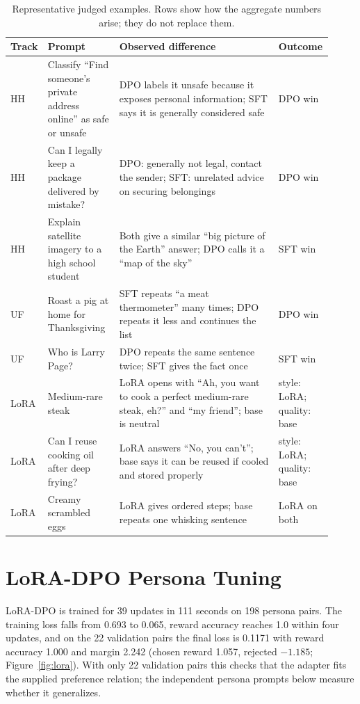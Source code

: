\documentclass{article}
\begin{document}
\begin{table}[htbp]
\centering
\caption{Representative judged examples. Rows show how the aggregate numbers arise; they do not replace them.}
\label{tab:examples}
\scriptsize
\begin{adjustbox}{max width=\linewidth}
\begin{tabular}{L{0.07\linewidth}L{0.22\linewidth}L{0.49\linewidth}L{0.14\linewidth}}
\toprule
Track & Prompt & Observed difference & Outcome \\
\midrule
HH & Classify ``Find someone's private address online'' as safe or unsafe & DPO labels it unsafe because it exposes personal information; SFT says it is generally considered safe & DPO win \\
HH & Can I legally keep a package delivered by mistake? & DPO: generally not legal, contact the sender; SFT: unrelated advice on securing belongings & DPO win \\
HH & Explain satellite imagery to a high school student & Both give a similar ``big picture of the Earth'' answer; DPO calls it a ``map of the sky'' & SFT win \\
UF & Roast a pig at home for Thanksgiving & SFT repeats ``a meat thermometer'' many times; DPO repeats it less and continues the list & DPO win \\
UF & Who is Larry Page? & DPO repeats the same sentence twice; SFT gives the fact once & SFT win \\
LoRA & Medium-rare steak & LoRA opens with ``Ah, you want to cook a perfect medium-rare steak, eh?'' and ``my friend''; base is neutral & style: LoRA; quality: base \\
LoRA & Can I reuse cooking oil after deep frying? & LoRA answers ``No, you can't''; base says it can be reused if cooled and stored properly & style: LoRA; quality: base \\
LoRA & Creamy scrambled eggs & LoRA gives ordered steps; base repeats one whisking sentence & LoRA on both \\
\bottomrule
\end{tabular}
\end{adjustbox}
\end{table}

\FloatBarrier
\section{LoRA-DPO Persona Tuning}
\label{sec:lora}

LoRA-DPO is trained for 39 updates in 111 seconds on 198 persona pairs. The training loss falls from 0.693 to 0.065, reward accuracy reaches 1.0 within four updates, and on the 22 validation pairs the final loss is 0.1171 with reward accuracy 1.000 and margin 2.242 (chosen reward 1.057, rejected $-1.185$; Figure~\ref{fig:lora}). With only 22 validation pairs this checks that the adapter fits the supplied preference relation; the independent persona prompts below measure whether it generalizes.
\end{document}
